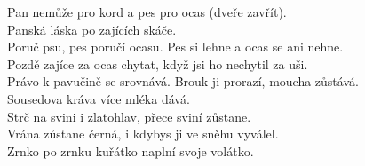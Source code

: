 \begin{multicols}{2}
Pan nemůže pro kord a pes pro ocas (dveře zavřít).\\
Panská láska po zajících skáče.\\
Poruč psu, pes poručí ocasu. Pes si lehne a ocas se ani nehne.\\
Pozdě zajíce za ocas chytat, když jsi ho nechytil za uši.\\
Právo k pavučině se srovnává. Brouk ji prorazí, moucha zůstává.\\
Sousedova kráva více mléka dává.\\
Strč na svini i zlatohlav, přece sviní zůstane.\\
Vrána zůstane černá, i kdybys ji ve sněhu vyválel.\\
Zrnko po zrnku kuřátko naplní svoje volátko.\\

\end{multicols}
\clearpage
